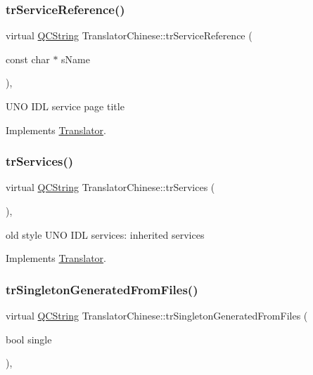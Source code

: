 \subsubsection{\texorpdfstring{trServiceReference()}{trServiceReference()}}
{\footnotesize\ttfamily virtual \mbox{\hyperlink{class_q_c_string}{Q\+C\+String}} Translator\+Chinese\+::tr\+Service\+Reference (\begin{DoxyParamCaption}\item[{const char $\ast$}]{s\+Name }\end{DoxyParamCaption})\hspace{0.3cm}{\ttfamily [inline]}, {\ttfamily [virtual]}}

U\+NO I\+DL service page title 

Implements \mbox{\hyperlink{class_translator}{Translator}}.

\mbox{\label{class_translator_chinese_a35780d2e80c5822148089f3e659ed637}} 
\subsubsection{\texorpdfstring{trServices()}{trServices()}}
{\footnotesize\ttfamily virtual \mbox{\hyperlink{class_q_c_string}{Q\+C\+String}} Translator\+Chinese\+::tr\+Services (\begin{DoxyParamCaption}{ }\end{DoxyParamCaption})\hspace{0.3cm}{\ttfamily [inline]}, {\ttfamily [virtual]}}

old style U\+NO I\+DL services\+: inherited services 

Implements \mbox{\hyperlink{class_translator}{Translator}}.

\mbox{\label{class_translator_chinese_a5ff94253b9445e10473aae6b459a1b9a}} 
\subsubsection{\texorpdfstring{trSingletonGeneratedFromFiles()}{trSingletonGeneratedFromFiles()}}
{\footnotesize\ttfamily virtual \mbox{\hyperlink{class_q_c_string}{Q\+C\+String}} Translator\+Chinese\+::tr\+Singleton\+Generated\+From\+Files (\begin{DoxyParamCaption}\item[{bool}]{single }\end{DoxyParamCaption})\hspace{0.3cm}{\ttfamily [inline]}, {\ttfamily [virtual]}}

